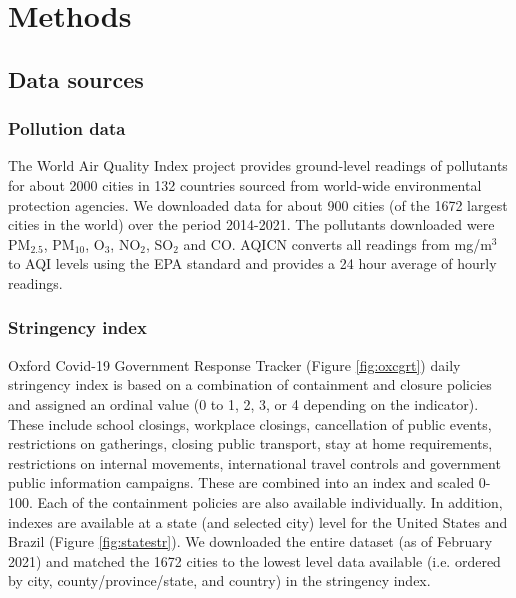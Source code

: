 \documentclass[final,3p,times,authoryear]{elsarticle}
\begin{document}
\section{Methods}
\subsection{Data sources}

\subsubsection{Pollution data}
The World Air Quality Index project \citep{AQICN2021} provides ground-level readings of pollutants for about 2000 cities in 132 countries sourced from world-wide environmental protection agencies. We downloaded data for about 900 cities (of the 1672 largest cities in the world\citep{UNDESA2015}) over the period 2014-2021. The pollutants downloaded were PM$_{2.5}$, PM$_{10}$, O$_{3}$, NO$_{2}$, SO$_{2}$ and CO. AQICN converts all readings from mg/m$^{3}$ to AQI levels using the EPA standard \citep{Gilliam2016} and provides a 24 hour average of hourly readings.



\subsubsection{Stringency index}

Oxford Covid-19 Government Response Tracker \citep{Hale2020} (Figure \ref{fig:oxcgrt}) daily stringency index is based on a combination of containment and closure policies and assigned an ordinal value (0 to 1, 2, 3, or 4 depending on the indicator). These include school closings, workplace closings, cancellation of public events, restrictions on gatherings, closing public transport, stay at home requirements, restrictions on internal movements, international travel controls and government public information campaigns. These are combined into an index and scaled 0-100. Each of the containment policies are also available individually. In addition, indexes are available at a state (and selected city) level for the United States and Brazil \citep{Hale2020a,Petherick2020} (Figure \ref{fig:statestr}). We downloaded the entire dataset (as of February 2021) and matched the 1672 cities to the lowest level data available (i.e. ordered by city, county/province/state, and country) in the stringency index.
\end{document}

